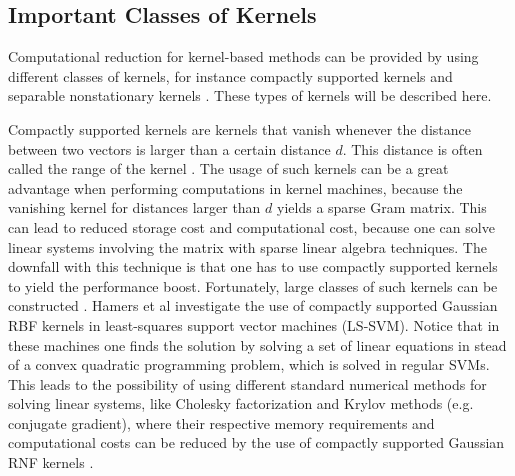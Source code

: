 \documentclass{article}
\theoremstyle{plain}
\theoremstyle{definition}
\theoremstyle{remark}
\begin{document}
\subsection{Important Classes of Kernels}

Computational reduction for kernel-based methods can be provided by using different classes of kernels, for instance compactly supported kernels and separable nonstationary kernels \cite{genton}. These types of kernels will be described here. 

Compactly supported kernels are kernels that vanish whenever the distance between two vectors is larger than a certain distance $d$. This distance is often called the range of the kernel \cite{genton}. The usage of such kernels can be a great advantage when performing computations in kernel machines, because the vanishing kernel for distances larger than $d$ yields a sparse Gram matrix. This can lead to reduced storage cost and computational cost, because one can solve linear systems involving the matrix with sparse linear algebra techniques. The downfall with this technique is that one has to use compactly supported kernels to yield the performance boost. Fortunately, large classes of such kernels can be constructed \cite{genton}. Hamers et al \cite{hamers} investigate the use of compactly supported Gaussian RBF kernels in least-squares support vector machines (LS-SVM). Notice that in these machines one finds the solution by solving a set of linear equations in stead of a convex quadratic programming problem, which is solved in regular SVMs. This leads to the possibility of using different standard numerical methods for solving linear systems, like Cholesky factorization and Krylov methods (e.g. conjugate gradient), where their respective memory requirements and computational costs can be reduced by the use of compactly supported Gaussian RNF kernels \cite{hamers}.
\end{document}
